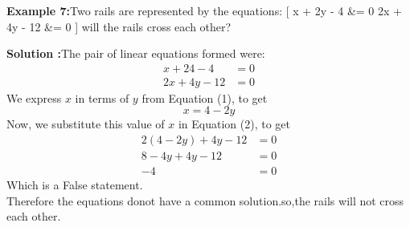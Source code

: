 \documentclass[a4paper,10pt]{article}
\begin{document}
\noindent
\textbf{\textcolor{cyanblue}{Example 7:}}Two rails are represented by the equations:
[
x + 2y - 4 &= 0 \quad {} \quad 2x + 4y - 12 &= 0 
]
will the rails cross each other?

\textbf{\textcolor{cyanblue}{Solution :}}The pair of linear equations formed were:
\begin{align}
x + 24 -4 &=0 \tag{1}\\
2x +4y -12 &=0 \tag{2}
\end{align}
 We express \( x \) in terms of \( y \) from Equation (1), to get
\[
x = 4 - 2y
\]
Now, we substitute this value of \( x \) in Equation (2), to get
\begin{align*}
2(4 - 2y) + 4y - 12 &= 0 \\
8 - 4y + 4y - 12 &= 0 \\
-4 &= 0 
\end{align*}
Which is a False statement.\\
Therefore the  equations donot have a common solution.so,the rails will not cross each other. 
\end{document}
